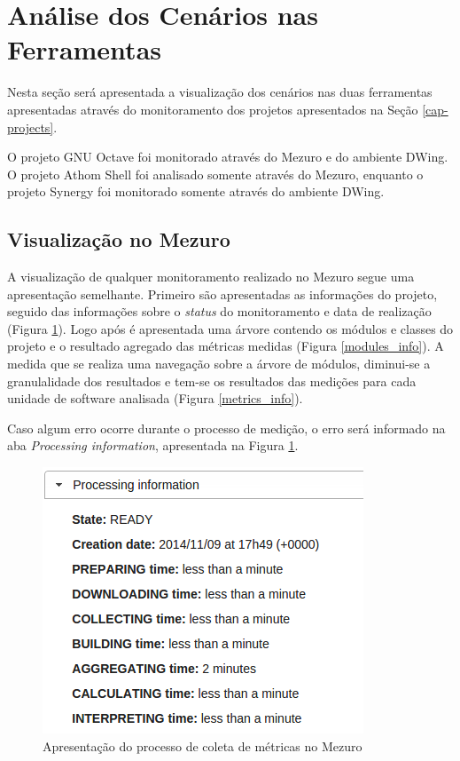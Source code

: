 \section{Análise dos Cenários nas Ferramentas}

Nesta seção será apresentada a visualização dos cenários nas duas ferramentas apresentadas através do monitoramento dos projetos apresentados na Seção \ref{cap-projects}.

O projeto GNU Octave foi monitorado através do Mezuro e do ambiente DWing. O projeto Athom Shell foi analisado somente através do Mezuro, enquanto o projeto Synergy foi monitorado somente através do ambiente DWing.

\subsection{Visualização no Mezuro}
\label{vision-mezuro}

A visualização de qualquer monitoramento realizado no Mezuro segue uma apresentação semelhante. Primeiro são apresentadas as informações do projeto, seguido das informações sobre o \emph{status} do monitoramento e data de realização (Figura \ref{proc_info}). Logo após é apresentada uma árvore contendo os módulos e classes do projeto e o resultado agregado das métricas medidas  (Figura \ref{modules_info}). A medida que se realiza uma navegação sobre a árvore de módulos, diminui-se a granulalidade dos resultados e tem-se os resultados das medições para cada unidade de software analisada (Figura \ref{metrics_info}).

Caso algum erro ocorre durante o processo de medição, o erro será informado na aba \emph{Processing information}, apresentada na Figura \ref{proc_info}. 

\begin{figure}[H]
	\centering
		\includegraphics[scale=0.5]{figuras/proc_info}
		\caption{Apresentação do processo de coleta de métricas no Mezuro}
		\label{proc_info}
\end{figure}

